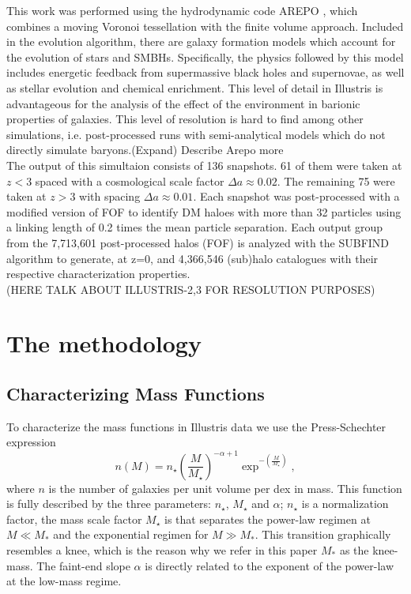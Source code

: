 \documentclass[a4paper,fleqn,usenatbib]{mnras}
\begin{document}
This work was  performed using the hydrodynamic code AREPO
\cite{Arepo}, which combines a moving Voronoi tessellation with the
finite volume approach. Included in the evolution algorithm, there are
galaxy formation models which account for the evolution of stars and
SMBHs. Specifically, the physics followed by this model includes
energetic feedback from supermassive black holes and supernovae, as
well as stellar evolution and chemical enrichment. This level of
detail in Illustris is advantageous for the analysis of the effect of
the environment in barionic properties of galaxies. This level of resolution is hard to find
among other simulations, i.e. post-processed runs with semi-analytical
models which do not directly simulate baryons.(Expand) Describe Arepo more\\ 

The output of this simultaion consists of 136 snapshots. 61 of
them were taken at $z < 3$ spaced with a cosmological scale factor
$\Delta a \approx 0.02$. The remaining 75 were taken at $z > 3$
with spacing $\Delta a \approx 0.01$. Each snapshot was post-processed
with a modified version of FOF \cite{FOF} to identify DM haloes with
more than 32 particles using a linking length of 0.2 times the mean
particle separation. Each output group from the 7,713,601 post-processed halos (FOF) is analyzed with the SUBFIND
algorithm \cite{SUBFIND} to generate, at z=0,
and 4,366,546 (sub)halo catalogues with their respective
characterization properties. \\ 

(HERE TALK ABOUT ILLUSTRIS-2,3 FOR RESOLUTION PURPOSES)

\section{The methodology}

\subsection{Characterizing Mass Functions}

To characterize the mass functions in Illustris data we use
the Press-Schechter expression
\begin{equation}
n(M) = n_\star\left( \frac{M}{M_\star} \right)^{-\alpha+1}\exp^{-\left( \frac{M}{M_\star}\right)},
\label{eq:Schechter}
\end{equation}
%
where $n$ is the number of galaxies per unit volume per dex in mass.
This function is fully described by the three parameters: $n_\star$,
$M_\star$ and $\alpha$; $n_\star$ is a normalization factor, the mass
scale factor $M_\star$ is that separates the power-law regimen at
$M\ll M_*$ and the exponential regimen for $M \gg M_*$. 
This transition graphically resembles a knee, which is the reason why
we refer in this paper $M_*$ as the knee-mass.
The faint-end slope $\alpha$ is directly related to the exponent of
the power-law at the low-mass regime. 
\end{document}
